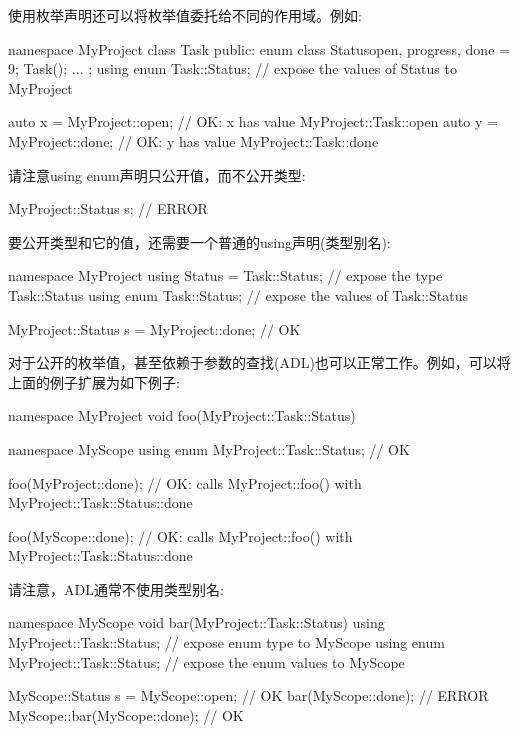 使用枚举声明还可以将枚举值委托给不同的作用域。例如:

\begin{cpp}
namespace MyProject {
	class Task {
		public:
		enum class Status{open, progress, done = 9};
		Task();
		...
	};
	using enum Task::Status; // expose the values of Status to MyProject
}

auto x = MyProject::open; // OK: x has value MyProject::Task::open
auto y = MyProject::done; // OK: y has value MyProject::Task::done
\end{cpp}

请注意using enum声明只公开值，而不公开类型:

\begin{cpp}
MyProject::Status s; // ERROR
\end{cpp}

要公开类型和它的值，还需要一个普通的using声明(类型别名):

\begin{cpp}
namespace MyProject {
	using Status = Task::Status; // expose the type Task::Status
	using enum Task::Status; // expose the values of Task::Status
}

MyProject::Status s = MyProject::done; // OK
\end{cpp}

对于公开的枚举值，甚至依赖于参数的查找(ADL)也可以正常工作。例如，可以将上面的例子扩展为如下例子:

\begin{cpp}
namespace MyProject {
	void foo(MyProject::Task::Status) {
	}
}

namespace MyScope {
	using enum MyProject::Task::Status; // OK
}

foo(MyProject::done); // OK: calls MyProject::foo() with MyProject::Task::Status::done

foo(MyScope::done); // OK: calls MyProject::foo() with MyProject::Task::Status::done
\end{cpp}

请注意，ADL通常不使用类型别名:

\begin{cpp}
namespace MyScope {
	void bar(MyProject::Task::Status) {
	}
	using MyProject::Task::Status; // expose enum type to MyScope
	using enum MyProject::Task::Status; // expose the enum values to MyScope
}

MyScope::Status s = MyScope::open; // OK
bar(MyScope::done); // ERROR
MyScope::bar(MyScope::done); // OK
\end{cpp}




